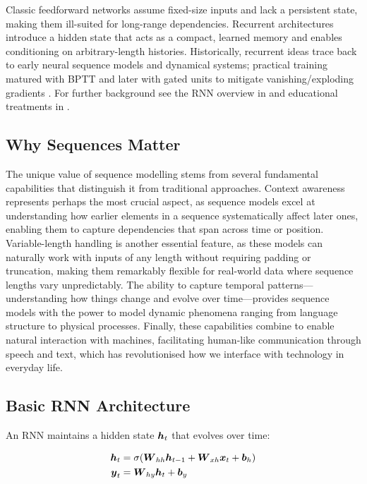 Classic feedforward networks assume fixed-size inputs and lack a persistent state, making them ill-suited for long-range dependencies. Recurrent architectures introduce a hidden state that acts as a compact, learned memory  and enables conditioning on arbitrary-length histories. Historically, recurrent ideas trace back to early neural sequence models and dynamical systems; practical training matured with BPTT \cite{Rumelhart1986} and later with gated units to mitigate vanishing/exploding gradients \cite{Hochreiter1997}. For further background see the RNN overview in \cite{GoodfellowEtAl2016} and educational treatments in \cite{D2LChapterRNN,WebRNNWikipedia,WebDLBRNN}.


\subsection{Why Sequences Matter}

The unique value of sequence modelling stems from several fundamental capabilities that distinguish it from traditional approaches. Context awareness represents perhaps the most crucial aspect, as sequence models excel at understanding how earlier elements in a sequence systematically affect later ones, enabling them to capture dependencies that span across time or position. Variable-length handling is another essential feature, as these models can naturally work with inputs of any length without requiring padding or truncation, making them remarkably flexible for real-world data where sequence lengths vary unpredictably. The ability to capture temporal patterns—understanding how things change and evolve over time—provides sequence models with the power to model dynamic phenomena ranging from language structure to physical processes. Finally, these capabilities combine to enable natural interaction with machines, facilitating human-like communication through speech and text, which has revolutionised how we interface with technology in everyday life.

\subsection{Basic RNN Architecture}

An RNN maintains a hidden state $\boldsymbol{h}_t$ that evolves over time:

\begin{align}
\boldsymbol{h}_t &= \sigma(\boldsymbol{W}_{hh} \boldsymbol{h}_{t-1} + \boldsymbol{W}_{xh} \boldsymbol{x}_t + \boldsymbol{b}_h) \\
\boldsymbol{y}_t &= \boldsymbol{W}_{hy} \boldsymbol{h}_t + \boldsymbol{b}_y
\end{align}

